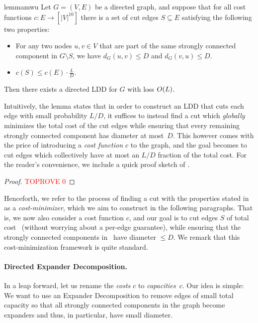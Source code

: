 \documentclass[letterpaper,11pt]{article}
\begin{document}
\begin{restatable}{lemma}{mwu} \label{lem:mwu}
Let $G = (V, E)$ be a directed graph, and suppose that for all cost functions $c : E \to [|V|^{10}]$ there is a set of cut edges $S \subseteq E$ satisfying the following two properties:
\begin{itemize}
	\item For any two nodes $u, v \in V$ that are part of the same strongly connected component in $G \setminus S$, we have $d_G(u, v) \leq D$ and $d_G(v, u) \leq D$.
	\item $c(S) \leq c(E) \cdot \frac{L}{D}$.
\end{itemize}
Then there exists a directed LDD for $G$ with loss $O(L)$.
\end{restatable}

Intuitively, the lemma states that in order to construct an LDD that cuts each edge with small probability $L / D$, it suffices to instead find a cut which \emph{globally} minimizes the total cost of the cut edges while ensuring that every remaining strongly connected component has diameter at most~$D$. This however comes with the price of introducing a \emph{cost function $c$} to the graph, and the goal becomes to cut edges which collectively have at most an $L / D$ fraction of the total cost. For the reader's convenience, we include a quick proof sketch of .

\begin{proof}\textcolor{red}{TOPROVE 0}\end{proof}

Henceforth, we refer to the process of finding a cut with the properties stated in  as a \emph{cost-minimizer}, which we aim to construct in the following paragraphs. That is, we now also consider a cost function $c$, and our goal is to cut edges $S$ of total cost~ (without worrying about a per-edge guarantee), while ensuring that the strongly connected components in~ have diameter $\leq D$. We remark that this cost-minimization framework is quite standard.

\paragraph{Directed Expander Decomposition.}
In a leap forward, let us rename the \emph{costs $c$} to \emph{capacities~$c$}. Our idea is simple: We want to use an Expander Decomposition to remove edges of small total capacity so that all strongly connected components in the graph become expanders and thus, in particular, have small diameter.
\end{document}
